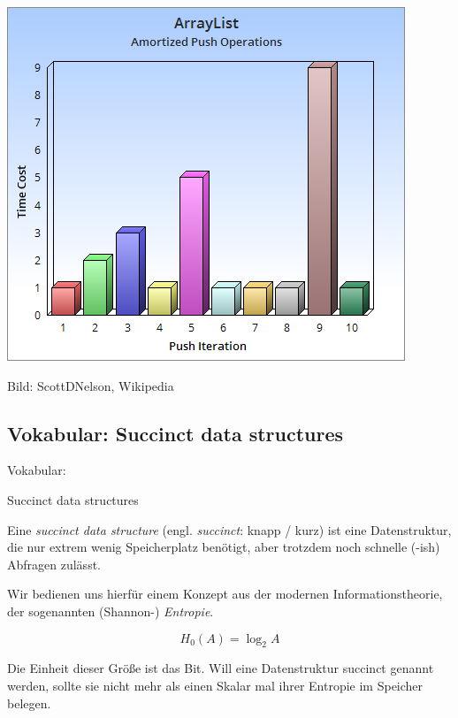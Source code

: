 \documentclass{beamer}
\begin{document}
\begin{frame}
\begin{center}
\includegraphics[scale=0.5]{AmortizedPush.png} 
\end{center}
\tiny
Bild: ScottDNelson, Wikipedia
\normalsize
\end{frame}

\subsection{Vokabular: Succinct data structures}

\begin{frame}
\Large
\begin{center}
Vokabular:

Succinct data structures
\end{center}
\normalsize
\end{frame}


\begin{frame}
Eine \emph{succinct data structure} (engl. \emph{succinct}: knapp / kurz) ist eine Datenstruktur, die nur extrem wenig Speicherplatz benötigt, aber trotzdem noch schnelle (-ish) Abfragen zulässt.\pause\bigskip

Wir bedienen uns hierfür einem Konzept aus der modernen Informationstheorie, der sogenannten (Shannon-) \emph{Entropie}.

$$H_0(A) = \log_2{A}$$

Die Einheit dieser Größe ist das Bit. Will eine Datenstruktur succinct genannt werden, sollte sie nicht mehr als einen Skalar mal ihrer Entropie im Speicher belegen.
\end{frame}
\end{document}
